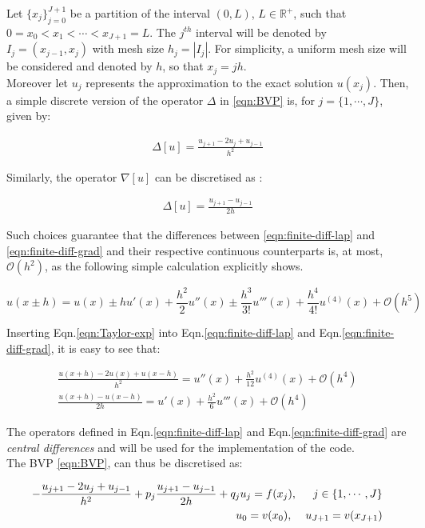 \documentclass[11pt]{article}
\theoremstyle{theorem}
\theoremstyle{definition}
\begin{document}
Let $\lbrace x_j\rbrace_{j=0}^{J+1}$ be a partition of the interval $(0, L)$, $L\in\mathbb{R}^+$, such that $0=x_0<x_1<\cdots<x_{J+1}=L$. The $j^{th}$ interval will be denoted by $I_j=(x_{j-1}, x_j)$ with mesh size $h_j=|I_j|$. For simplicity, a uniform mesh size will be considered and denoted by $h$, so that $x_j=jh$.\\
Moreover let $u_j$ represents the approximation to the exact solution $u(x_j)$. Then, a simple discrete version of the operator $\Delta$ in \eqref{eqn:BVP} is, for $j=\lbrace 1, \cdots, J\rbrace$, given by:

\begin{align}
	\label{eqn:finite-diff-lap}
	\Delta[u]=\frac{u_{j+1}-2u_j+u_{j-1}}{h^2}
\end{align}

Similarly, the operator $\nabla [u]$ can be discretised as :

\begin{align}
\label{eqn:finite-diff-grad}
\Delta[u]=\frac{u_{j+1}-u_{j-1}}{2h}
\end{align}

Such choices guarantee that the differences between \eqref{eqn:finite-diff-lap} and \eqref{eqn:finite-diff-grad} and their respective continuous counterparts is, at most, $\mathcal{O}(h^2)$, as the following simple calculation explicitly shows. 

\begin{equation}\label{eqn:Taylor-exp}
u(x\pm h)=u(x)\pm hu'(x)+\frac{h^2}{2}u''(x)\pm \frac{h^3}{3!}u'''(x)+\frac{h^4}{4!}u^{(4)}(x)+\mathcal{O}(h^5)
\end{equation}

Inserting Eqn.\eqref{eqn:Taylor-exp} into Eqn.\ref{eqn:finite-diff-lap} and Eqn.\eqref{eqn:finite-diff-grad}, it is easy to see that:

\begin{align}
	\frac{u(x+h)-2u(x)+u(x-h)}{h^2}=u''(x)+\frac{h^2}{12}u^{(4)}(x)+\mathcal{O}(h^4)\\
	\frac{u(x+h)-u(x-h)}{2h}=u'(x)+\frac{h^2}{6}u'''(x)+\mathcal{O}(h^4)
\end{align}

The operators defined in Eqn.\ref{eqn:finite-diff-lap} and Eqn.\eqref{eqn:finite-diff-grad} are \emph{central differences} and will be used for the implementation of the code.\\

The BVP \eqref{eqn:BVP}, can thus be discretised as:

\begin{align}\label{eqn:BVP-discrete}
\begin{split}
-\frac{u_{j+1}-2u_j+u_{j-1}}{h^2}+p_j\frac{u_{j+1}-u_{j-1}}{2h}+q_ju_j=f(x_j), \hspace{5mm}j\in\lbrace 1, \cdots, J\rbrace\\
u_0=v(x_0),\hspace{4mm} u_{J+1}=v(x_{J+1})
\end{split}
\end{align}
	
\end{document}
